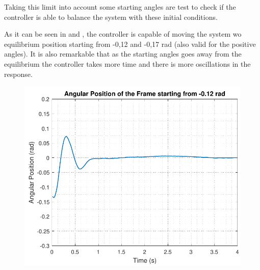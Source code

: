 Taking this limit into account some starting angles are test to check if the controller is able to balance the system with these initial conditions. 

As it can be seen in  and , the controller is capable of moving the system wo equilibrium position starting from -0,12 and -0,17 rad (also valid for the positive angles). It is also remarkable that as the starting angles goes away from the equilibrium the controller takes more time and there is more oscillations in the response.

\begin{minipage}{\linewidth}
	\begin{minipage}{0.45\linewidth}
		\begin{figure}[H]
			\includegraphics[scale=.55]{figures/testCatch_12}
			\centering
			\captionsetup{justification=centering}
			\label{testCatch_12}
		\end{figure}
	\end{minipage}
	\hspace{0.03\linewidth}
	\begin{minipage}{0.45\linewidth}
		\begin{figure}[H]\vspace{-3mm}

\end{figure}
\end{minipage}
\end{minipage}

